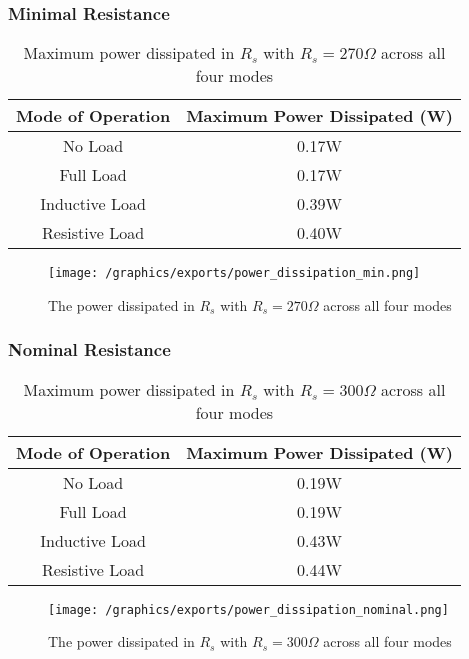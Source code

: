 \subsubsection{Minimal Resistance}
\begin{table}[H]
\centering
\begin{tabular}{|c|c|}\hline
	\textbf{Mode of Operation} & \textbf{Maximum Power Dissipated (W)} \\\hline
	No Load & 0.17W \\
	Full Load &  0.17W \\
	Inductive Load & 0.39W \\
	Resistive Load & 0.40W \\\hline
\end{tabular}
\caption{Maximum power dissipated in $R_s$ with $R_s = 270\Omega$ across all four modes}
\end{table}
\begin{figure}[H]
	\centering
	\texttt{[image: /graphics/exports/power\_dissipation\_min.png]}
	\caption{The power dissipated in $R_s$ with $R_s = 270\Omega$ across all four modes}
\end{figure}

\subsubsection{Nominal Resistance}
\begin{table}[H]
\centering
\begin{tabular}{|c|c|}\hline
	\textbf{Mode of Operation} & \textbf{Maximum Power Dissipated (W)} \\\hline
	No Load & 0.19W \\
	Full Load &  0.19W \\
	Inductive Load & 0.43W \\
	Resistive Load & 0.44W \\\hline
\end{tabular}
\caption{Maximum power dissipated in $R_s$ with $R_s = 300\Omega$ across all four modes}
\end{table}
\begin{figure}[H]
	\centering
	\texttt{[image: /graphics/exports/power\_dissipation\_nominal.png]}
	\caption{The power dissipated in $R_s$ with $R_s = 300\Omega$ across all four modes}
\end{figure}

